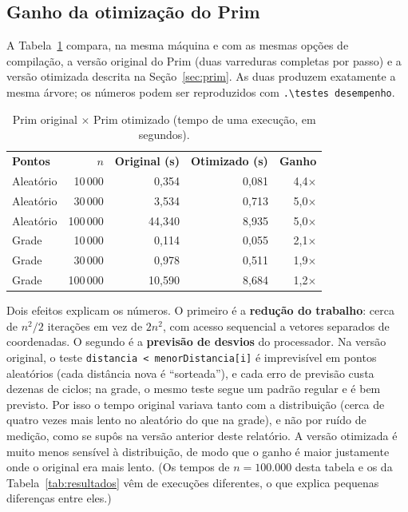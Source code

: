 \documentclass[11pt,a4paper]{article}
\newcommand{\cab}[1]{\leavevmode\color{white}\bfseries #1}
\newcommand{\fioCabecalho}{\arrayrulecolor{tabFio}\specialrule{1.2pt}{0pt}{0pt}\arrayrulecolor{eachTeal}}
\renewcommand{\_}{\underscoreoriginal\allowbreak}
\begin{document}
\subsection{Ganho da otimização do Prim}
\label{sec:ganho}

A Tabela~\ref{tab:ganho} compara, na mesma máquina e com as mesmas
opções de compilação, a versão original do Prim (duas varreduras
completas por passo) e a versão otimizada descrita na
Seção~\ref{sec:prim}. As duas produzem exatamente a mesma árvore; os
números podem ser reproduzidos com \texttt{.\textbackslash testes
desempenho}.

\begin{table}[H]
\centering
\caption{Prim original $\times$ Prim otimizado (tempo de uma execução, em segundos).}
\label{tab:ganho}
\begin{tabular}{l r r r r}
\toprule
\rowcolor{tabCabecalho}
\cab{Pontos} & \cab{$n$} & \cab{Original (s)} & \cab{Otimizado (s)} & \cab{Ganho}\\
\fioCabecalho
Aleatório & 10\,000 & 0{,}354 & 0{,}081 & 4{,}4$\times$ \\
Aleatório & 30\,000 & 3{,}534 & 0{,}713 & 5{,}0$\times$ \\
Aleatório & 100\,000 & 44{,}340 & 8{,}935 & 5{,}0$\times$ \\
Grade & 10\,000 & 0{,}114 & 0{,}055 & 2{,}1$\times$ \\
Grade & 30\,000 & 0{,}978 & 0{,}511 & 1{,}9$\times$ \\
Grade & 100\,000 & 10{,}590 & 8{,}684 & 1{,}2$\times$ \\
\bottomrule
\end{tabular}
\end{table}

Dois efeitos explicam os números. O primeiro é a \textbf{redução do
trabalho}: cerca de $n^2/2$ iterações em vez de $2n^2$, com acesso
sequencial a vetores separados de coordenadas. O segundo é a
\textbf{previsão de desvios} do processador. Na versão original, o teste
\texttt{distancia < menorDistancia[i]} é imprevisível em pontos
aleatórios (cada distância nova é ``sorteada''), e cada erro de
previsão custa dezenas de ciclos; na grade, o mesmo teste segue um
padrão regular e é bem previsto. Por isso o tempo original variava
tanto com a distribuição (cerca de quatro vezes mais lento no aleatório
do que na grade), e não por ruído de medição, como se supôs na versão
anterior deste relatório. A versão otimizada é muito menos sensível à
distribuição, de modo que o ganho é maior justamente onde o original
era mais lento. (Os tempos de $n=100.000$ desta tabela e
os da Tabela~\ref{tab:resultados} vêm de execuções diferentes, o que
explica pequenas diferenças entre eles.)
\end{document}
